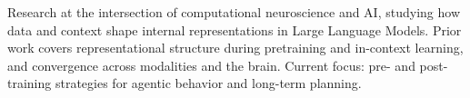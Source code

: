 %

\noindent
Research at the intersection of computational neuroscience and AI, studying how data and context shape internal representations in Large Language Models. Prior work covers representational structure during pretraining and in-context learning, and convergence across modalities and the brain. Current focus: pre- and post-training strategies for agentic behavior and long-term planning.

\vspace{0.5em}
